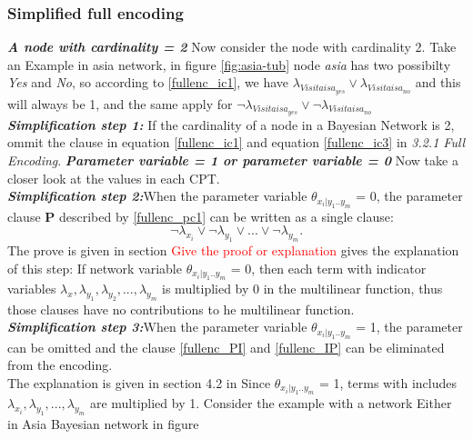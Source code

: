         \subsubsection{Simplified full encoding}
        \textbf{\textit{A node with cardinality = 2}}
        Now consider the node with cardinality 2. Take an Example in asia network, in figure \ref{fig:asia-tub} node \textit{asia} has two possibilty \textit{Yes} and \textit{No}, so according to \ref{fullenc_ic1}, we have $\lambda_{Visitaisa_{yes}} \vee \lambda_{Visitaisa_{no}}$ and this will always be 1, and the same apply for $\neg\lambda_{Visitaisa_{yes}} \vee \neg\lambda_{Visitaisa_{no}}$ \\
        \newline
        \noindent \textit{\textbf{Simplification step 1:}} If the cardinality of a node in a Bayesian Network is 2, ommit the clause in equation \ref{fullenc_ic1} and equation \ref{fullenc_ic3} in \textit{3.2.1 Full Encoding}.
        \newline
        \textbf{\textit{Parameter variable = 1 or parameter variable = 0}}
        Now take a closer look at the values in each CPT. \\
        \newline
        \noindent \textit{\textbf{Simplification step 2:}}When the parameter variable $\theta_{x_{i}|y_{1}..y_{m}}$ = 0, the parameter clause \textbf{P} described by \ref{fullenc_pc1} can be written as a single clause: $$\neg\lambda_{x_{i}} \vee \neg\lambda_{y_{1}} \vee... \vee \neg\lambda_{y_{m}}.$$
        The prove is given in section \textcolor{red}{Give the proof or explanation}
        \cite{enc1} gives the explanation of this step: If network variable $\theta_{x_{i}|y_{1}..y_{m}}$ = 0, then each term with indicator variables $\lambda_{x}, \lambda_{y_{1}}, \lambda_{y_{2}}, ..., \lambda_{y_{m}}$ is multiplied by 0 in the multi\-linear function, thus those clauses have no contributions to he multi\-linear function.\\
        \newline
        \noindent \textit{\textbf{Simplification step 3:}}When the parameter variable $\theta_{x_{i}|y_{1}..y_{m}}$ = 1, the parameter can be omitted and the clause \ref{fullenc_PI} and \ref{fullenc_IP} can be eliminated from the encoding.\\
        
        The explanation is given in section 4.2 in \cite{enc1} 
        Since $\theta_{x_{i}|y_{1}..y_{m}}$ = 1, terms with includes $\lambda_{x_{i}}, \lambda_{y_{1}}, ..., \lambda_{y_{m}}$ are multiplied by 1. 
        Consider the example with a network Either in Asia Bayesian network in figure
        

